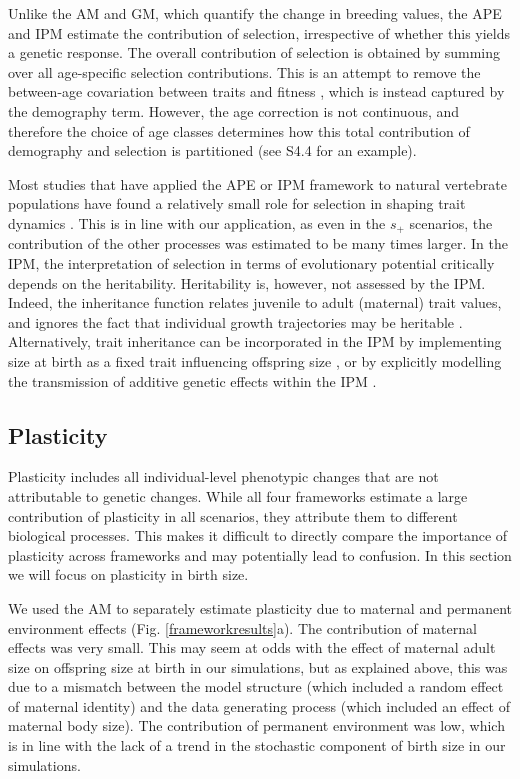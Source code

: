 Unlike the AM and GM, which quantify the change in breeding values, the APE and IPM estimate the contribution of selection, irrespective of whether this yields a genetic response. The overall contribution of selection is obtained by summing over all age-specific selection contributions. This is an attempt to remove the between-age covariation between traits and fitness \parencite{engen2014b}, which is instead captured by the demography term. However, the age correction is not continuous, and therefore the choice of age classes determines how this total contribution of demography and selection is partitioned (see S4.4 for an example).

Most studies that have applied the APE or IPM framework to natural vertebrate populations have found a relatively small role for selection in shaping trait dynamics \parencite[e.g.][]{Ozgul2009,traill2014demography}. This is in line with our application, as even in the $s_+$ scenarios, the contribution of the other processes was estimated to be many times larger. In the IPM, the interpretation of selection in terms of evolutionary potential critically depends on the heritability. Heritability is, however, not assessed by the IPM. Indeed, the inheritance function relates juvenile to adult (maternal) trait values, and ignores the fact that individual growth trajectories may be heritable \parencite{Chevin2015a}. Alternatively, trait inheritance can be incorporated in the IPM by implementing size at birth as a fixed trait influencing offspring size \parencite{vindenes2015}, or by explicitly modelling the transmission of additive genetic effects within the IPM \parencite{Coulson2015,Childs2016}.

\subsection*{Plasticity}
Plasticity includes all individual-level phenotypic changes that are not attributable to genetic changes. While all four frameworks estimate a large contribution of plasticity in all scenarios, they attribute them to different biological processes. This makes it difficult to directly compare the importance of plasticity across frameworks and may potentially lead to confusion. In this section we will focus on plasticity in birth size.

We used the AM to separately estimate plasticity due to maternal and permanent environment effects (Fig. \ref{frameworkresults}a). The contribution of maternal effects was very small. This may seem at odds with the effect of maternal adult size on offspring size at birth in our simulations, but as explained above, this was due to a mismatch between the model structure (which included a random effect of maternal identity) and the data generating process  (which included an effect of maternal body size). The contribution of permanent environment was low, which is in line with the lack of a trend in the stochastic component of birth size in our simulations.


